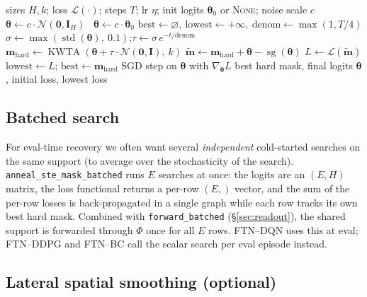 \documentclass[11pt]{article}
\newcommand{\parMLP}{\Phi}                 %
\newcommand{\mask}{\bm{m}}                 %
\newcommand{\masksoft}{\tilde{\bm{m}}}     %
\newcommand{\Ho}{H}                        %
\newcommand{\kk}{k}                        %
\newcommand{\kwta}{\operatorname{KWTA}}
\newcommand{\code}[1]{\texttt{\small #1}}
\begin{document}
\begin{algorithm}[t]
\caption{\code{anneal\_ste\_mask}: annealed STE search for one $\kk$-hot mask}
\label{alg:ste}
\begin{algorithmic}[1]
\Require sizes $\Ho,\kk$; loss $\mathcal L(\cdot)$; steps $T$; lr $\eta$; init logits $\bm\theta_0$ or \textsc{None}; noise scale $c$
 $\bm\theta \gets c\cdot\mathcal N(\bm 0,\bm I_{\Ho})$ 
\Else\ $\bm\theta \gets c\cdot\bm\theta_0$  \EndIf
\State $\text{best}\gets\varnothing,\ \text{lowest}\gets+\infty,\ \text{denom}\gets\max(1, T/4)$
  \State $\sigma \gets \max(\operatorname{std}(\bm\theta),\ 0.1)$;\quad $\tau \gets \sigma\,e^{-t/\text{denom}}$
  \State $\mask_{\mathrm{hard}} \gets \kwta(\bm\theta + \tau\cdot\mathcal N(\bm 0,\bm I),\ \kk)$
  \State $\masksoft \gets \mask_{\mathrm{hard}} + \bm\theta - \operatorname{sg}(\bm\theta)$ 
  \State $L \gets \mathcal L(\masksoft)$
   $\text{lowest}\gets L$; $\text{best}\gets \mask_{\mathrm{hard}}$ \EndIf
  \State SGD step on $\bm\theta$ with $\nabla_{\bm\theta} L$
\EndFor
\State \Return best hard mask, final logits $\bm\theta$, initial loss, lowest loss
\end{algorithmic}
\end{algorithm}

\subsection{Batched search}
\label{sec:ste-batched}

For eval-time recovery we often want several \emph{independent} cold-started
searches on the same support (to average over the stochasticity of the search).
\code{anneal\_ste\_mask\_batched} runs $E$ searches at once: the logits are an
$(E,\Ho)$ matrix, the loss functional returns a per-row $(E,)$ vector, and the sum
of the per-row losses is back-propagated in a single graph while each row tracks
its own best hard mask. Combined with \code{forward\_batched}
(\S\ref{sec:readout}), the shared support is forwarded through $\parMLP$ once for
all $E$ rows. FTN--DQN uses this at eval; FTN--DDPG and FTN--BC call the scalar
search per eval episode instead.

\subsection{Lateral spatial smoothing (optional)}
\label{sec:smooth}
\end{document}
